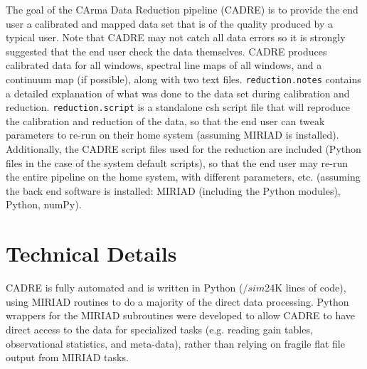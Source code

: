 The goal of the CArma Data Reduction pipeline (CADRE) is to provide the end user a calibrated and mapped data set that is of the quality produced by a typical user. Note that CADRE may not catch all data errors so it is strongly suggested that the end user check the data themselves. CADRE produces calibrated data for all windows, spectral line maps of all windows, and a continuum map (if possible), along with two text files. \verb#reduction.notes# contains a detailed explanation of what was done to the data set during calibration and reduction. \verb#reduction.script# is a standalone csh script file that will reproduce the calibration and reduction of the data, so that the end user can tweak parameters to re-run on their home system (assuming MIRIAD is installed). Additionally, the CADRE script files used for the reduction are included (Python files in the case of the system default scripts), so that the end user may re-run the entire pipeline on the home system, with different parameters, etc. (assuming the back end software is installed: MIRIAD (including the Python modules), Python, numPy).

\section{Technical Details}

CADRE is fully automated and is written in Python ($/sim$24K lines of code), using MIRIAD \citep{stw95} routines to do a majority of the direct data processing. Python wrappers for the MIRIAD subroutines were developed to allow CADRE to have direct access to the data for specialized tasks (e.g. reading gain tables, observational statistics, and meta-data), rather than relying on fragile flat file output from MIRIAD tasks.

